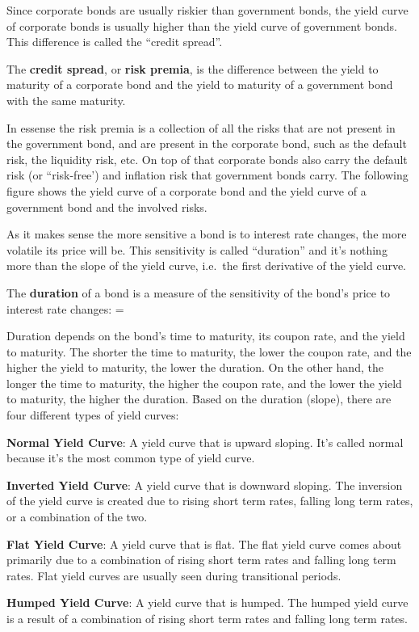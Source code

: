 Since corporate bonds are usually riskier than government bonds, the yield curve of corporate bonds is usually higher
than the yield curve of government bonds. This difference is called the ``credit spread''.

The \textbf{credit spread}, or \textbf{risk premia}, is the difference between the yield to maturity of a corporate
bond and the yield to maturity of a government bond with the same maturity.
\ed

In essense the risk premia is a collection of all the risks that are not present in the government bond, and are
present in the corporate bond, such as the default risk, the liquidity risk, etc. On top of that corporate bonds also
carry the default risk (or ``risk-free') and inflation risk that government bonds carry. The following figure shows the
yield curve of a corporate bond and the yield curve of a government bond and the involved risks.


As it makes sense the more sensitive a bond is to interest rate changes, the more volatile its price will be. This
sensitivity is called ``duration'' and it's nothing more than the slope of the yield curve, i.e.\ the first derivative
of the yield curve.

\bd[Duration]
The \textbf{duration} of a bond is a measure of the sensitivity of the bond's price to interest rate changes:
\bse
{} = 
\ese
\ed

Duration depends on the bond's time to maturity, its coupon rate, and the yield to maturity. The shorter the time to
maturity, the lower the coupon rate, and the higher the yield to maturity, the lower the duration. On the other hand,
the longer the time to maturity, the higher the coupon rate, and the lower the yield to maturity, the higher the
duration. \v

Based on the duration (slope), there are four different types of yield curves:
\bit
\item \textbf{Normal Yield Curve}: A yield curve that is upward sloping. It's called normal because it's the most
common type of yield curve.
\item \textbf{Inverted Yield Curve}: A yield curve that is downward sloping. The inversion of the yield curve is created
due to rising short term rates, falling long term rates, or a combination of the two.
\item \textbf{Flat Yield Curve}: A yield curve that is flat. The flat yield curve comes about primarily due to a
combination of rising short term rates and falling long term rates. Flat yield curves are usually seen during
transitional periods.
\item \textbf{Humped Yield Curve}: A yield curve that is humped. The humped yield curve is a result of a combination
of rising short term rates and falling long term rates.
\eit

